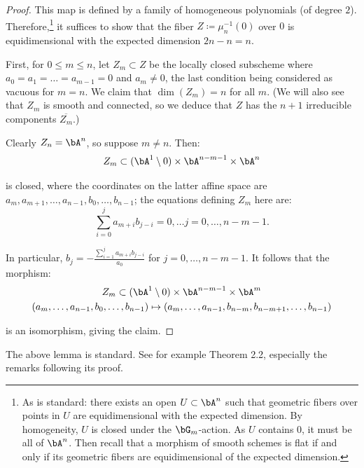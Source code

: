 \begin{proof}

This map is defined by a family of homogeneous polynomials
(of degree $2$). Therefore,\footnote{As is standard: there exists
an open $U \subset \bA^n$ such that geometric fibers over
points in $U$ are equidimensional with
the expected dimension. By homogeneity, $U$
is closed under the $\bG_m$-action. As $U$ contains $0$,
it must be all of $\bA^n$. Then recall that a morphism
of smooth schemes is flat if and only if its geometric fibers are
equidimensional of the expected dimension.}
it suffices to show that the
fiber $Z \coloneqq \mu_n^{-1}(0)$
over $0$ is equidimensional with the expected
dimension $2n - n = n$.

First, for $0 \leq m \leq n$, let $Z_m \subset Z$ be the locally
closed subscheme where $a_0 = a_1 = \ldots = a_{m-1} = 0$
and $a_m \neq 0$, the last condition being considered as vacuous
for $m = n$. We claim that $\dim(Z_m) = n$ for all $m$. (We
will also see that $Z_m$ is smooth and connected, so we deduce
that $Z$ has the $n+1$ irreducible components $\overline{Z_m}$.)

Clearly $Z_n = \bA^n$, so
suppose $m \neq n$. Then:
%
\[
Z_m \subset (\bA^1 \setminus 0) \times \bA^{n-m-1} \times \bA^n
\]

 is closed, where the coordinates on the latter affine
space are $a_m,a_{m+1},\ldots,a_{n-1},b_0,\ldots,b_{n-1}$;
the equations defining $Z_m$ here are:
%
\[
\sum_{i=0}^j a_{m+i} b_{j-i} = 0, \ldots j = 0,\ldots,n-m-1.
\]

 In particular,
$b_j = -\frac{\sum_{i=1}^j a_{m+i} b_{j-i}}{a_0}$ for
$j = 0,\ldots,n-m-1$. It follows
that the morphism:
%
\[
\begin{gathered}
Z_m \subset
(\bA^1 \setminus 0) \times \bA^{n-m-1} \times  \bA^{m} \\
(a_m,\ldots,a_{n-1},b_0,\ldots,b_{n-1}) \mapsto
(a_m,\ldots,a_{n-1},b_{n-m},b_{n-m+1},\ldots,b_{n-1})
\end{gathered}
\]

 is an isomorphism, giving the claim.

\end{proof}

\begin{rem}
\notready

The above lemma is standard. See for example
\cite{goward-smith} Theorem 2.2, especially the remarks
following its proof.

\end{rem}

